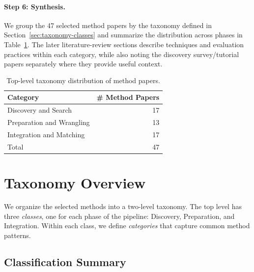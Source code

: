 \documentclass[sigconf]{acmart}
\newcommand{\tbl}{%
  \scriptsize
  \setlength{\tabcolsep}{4pt}%
  \renewcommand{\arraystretch}{1.12}%
}
\begin{document}
\paragraph{Step 6: Synthesis.}
We group the 47 selected method papers by the taxonomy defined in Section~\ref{sec:taxonomy-classes} and summarize the distribution across phases in Table~\ref{tab:taxonomy-summary}. The later literature-review sections describe techniques and evaluation practices within each category, while also noting the discovery survey/tutorial papers separately where they provide useful context.

\begin{table}[!htbp]
  \caption{Top-level taxonomy distribution of method papers.}
  \label{tab:taxonomy-summary}
  \centering
  \tbl
  \begin{tabular}{lr}
    \toprule
    Category & \# Method Papers \\
    \midrule
    Discovery and Search & 17 \\
    Preparation and Wrangling & 13 \\
    Integration and Matching & 17 \\
    \midrule
    Total & 47 \\
    \bottomrule
  \end{tabular}
\end{table}


\section{Taxonomy Overview}

We organize the selected methods into a two-level taxonomy. The top level has three \emph{classes}, one for each phase of the pipeline: Discovery, Preparation, and Integration. Within each class, we define \emph{categories} that capture common method patterns.


\subsection{Classification Summary}
\end{document}
